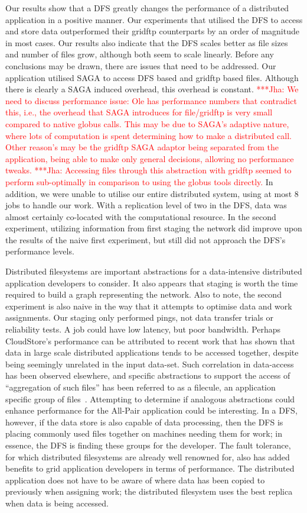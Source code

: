 \documentclass[a4paper,11pt]{article}
\newcommand{\jhanote}[1]{ {\textcolor{red} { ***Jha: #1 }}}
\newcommand{\jhanote}[1]{}
\begin{document}
Our results show that a DFS greatly changes the performance of a
distributed application in a positive manner. Our experiments that
utilised the DFS to access and store data outperformed their gridftp
counterparts by an order of magnitude in most cases. Our results also
indicate that the DFS scales better as file sizes and number of files
grow, although both seem to scale linearly. Before any conclusions may
be drawn, there are issues that need to be addressed. Our application
utilised SAGA to access DFS based and gridftp based files. Although
there is clearly a SAGA induced overhead, this overhead is constant.
\jhanote{ We need to discuss performance issue: Ole has performance
numbers that contradict this, i.e., the overhead that SAGA introduces
for file/gridftp is very small compared to native globus calls. This may
be due to SAGA's adaptive nature, where lots of computation is spent
determining how to make a distributed call. Other reason's may be the
gridftp SAGA adaptor being separated from the application, being able
to make only general decisions, allowing no performance tweaks. }
\jhanote{Accessing files through this abstraction with gridftp seemed to
perform sub-optimally in comparison to using the globus tools directly.}
In addition, we were unable to utilise our entire
distributed system, using at most 8 jobs to handle our work. With a
replication level of two in the DFS, data was almost certainly
co-located with the computational resource. In the second experiment,
utilizing information from first staging the network did improve upon
the results of the naive first experiment, but still did not approach
the DFS's performance levels.

Distributed filesystems are important abstractions for a data-intensive
distributed application developers to consider. It also appears that
staging is worth the time required to build a graph representing the
network. Also to note, the second experiment is also naive in the way
that it attempts to optimise data and work assignments. Our staging only
performed pings, not data transfer trials or reliability tests. A job
could have low latency, but poor bandwidth. Perhaps CloudStore's
performance can be attributed to recent work that has shown that data in
large scale distributed applications tends to be accessed together,
despite being seemingly unrelated in the input data-set. Such
correlation in data-access has been observed elsewhere, and specific
abstractions to support the access of ``aggregation of such files'' has
been referred to as a filecule, an application specific group of
files~\cite{filecule}. Attempting to determine if analogous abstractions
could enhance performance for the All-Pair application could be
interesting.  In a DFS, however, if the data store is also capable of
data processing, then the DFS is placing commonly used files together on
machines needing them for work; in essence, the DFS is finding these
groups for the developer. The fault tolerance, for which distributed
filesystems are already well renowned for, also has added benefits to
grid application developers in terms of performance. The distributed
application does not have to be aware of where data has been copied to
previously when assigning work; the distributed filesystem uses the best
replica when data is being accessed.
\end{document}

